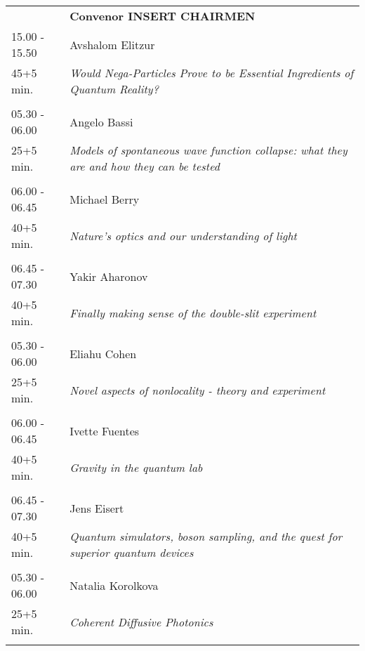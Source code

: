 \begin{longtable}{p{3cm}p{13cm}}
&\hfill {\bf Convenor INSERT CHAIRMEN }\\ 
15.00 - 15.50 & Avshalom Elitzur\\ 
45+5 min. & {\it Would Nega-Particles Prove to be Essential Ingredients of Quantum Reality?}\\ 
 & \\ 
05.30 - 06.00 & Angelo Bassi\\ 
25+5 min. & {\it Models of spontaneous wave function collapse: what they are and how they can be tested}\\ 
 & \\ 
06.00 - 06.45 & Michael Berry\\ 
40+5 min. & {\it Nature's optics and our understanding of light}\\ 
 & \\ 
06.45 - 07.30 & Yakir Aharonov\\ 
40+5 min. & {\it Finally making sense of the double-slit experiment}\\ 
 & \\ 
05.30 - 06.00 & Eliahu Cohen\\ 
25+5 min. & {\it Novel aspects of nonlocality - theory and experiment}\\ 
 & \\ 
06.00 - 06.45 & Ivette Fuentes\\ 
40+5 min. & {\it Gravity in the quantum lab}\\ 
 & \\ 
06.45 - 07.30 & Jens Eisert\\ 
40+5 min. & {\it Quantum simulators, boson sampling, and the quest for superior quantum devices}\\ 
 & \\ 
05.30 - 06.00 & Natalia Korolkova\\ 
25+5 min. & {\it Coherent Diffusive Photonics}\\ 
 & \\ 
\end{longtable}

